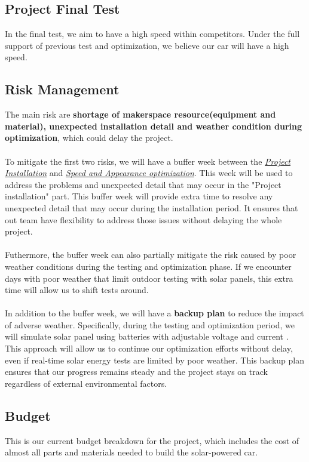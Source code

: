 \documentclass[12pt]{article}
\begin{document}
\subsection{Project Final Test}
In the final test, we aim to have a high speed within competitors. Under the full support of previous test and optimization, we believe our car will have a high speed.
\subsection{Risk Management}
The main risk are \textbf{shortage of makerspace resource(equipment and material), unexpected installation detail and weather condition during optimization}, which could delay the project.
\\
\\
To mitigate the first two risks, we will have a buffer week between the \textit{\hyperref[sec:installation]{Project Installation}} and \textit{\hyperref[sec:Optimization]{Speed and Appearance optimization}}. 
This week will be used to address the problems and unexpected detail that may occur in the "Project installation" part. This buffer week will provide extra time to resolve any unexpected detail that may occur during the installation period.
It ensures that out team have flexibility to address those issues without delaying the whole project.
\\
\\
Futhermore, the buffer week can also partially mitigate the risk caused by poor weather conditions during the testing and optimization phase. 
If we encounter days with poor weather that limit outdoor testing with solar panels, 
this extra time will allow us to shift tests around.
\\
\\
In addition to the buffer week, we will have a \textbf{backup plan} to reduce the impact of adverse weather. Specifically, during the testing and optimization period, 
we will simulate solar panel using batteries with adjustable voltage and current                                           . 
This approach will allow us to continue our optimization efforts without delay, 
even if real-time solar energy tests are limited by poor weather. 
This backup plan ensures that our progress remains steady and the project stays on track regardless of external environmental factors.

\subsection{Budget}
This is our current budget breakdown for the project, which includes the cost of almost all parts and materials needed to build the solar-powered car.
\end{document}
